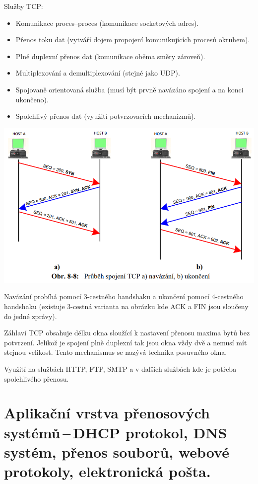 Služby TCP:
\begin{itemize}[noitemsep]
    \item Komunikace proces--proces (komunikace socketových adres).
    \item Přenos toku dat (vytváří dojem propojení komunikujících procesů okruhem).
    \item Plně duplexní přenos dat (komunikace oběma směry zároveň).
    \item Multiplexování a demultiplexování (stejné jako UDP).
    \item Spojovaně orientovaná služba (musí být prvně navázáno spojení a na konci ukončeno).
    \item Spolehlivý přenos dat (využití potvrzovacích mechanizmů).
\end{itemize}

\begin{center}
\includegraphics[scale = 0.5]{images/-052.png}
\end{center}

Navázání probíhá pomocí 3-cestného handshaku a ukončení pomocí 4-cestného handshaku (existuje 3-cestná varianta na obrázku kde ACK a FIN jsou sloučeny do jedné zprávy). 

Záhlaví TCP obsahuje délku okna sloužící k nastavení přenosu maxima bytů bez potvrzení. Jelikož je spojení plně duplexní tak jsou okna vždy dvě a nemusí mít stejnou velikost. Tento mechanismus se nazývá technika posuvného okna. 

Využití na službách HTTP, FTP, SMTP a v dalších službách kde je potřeba spolehlivého přenosu.

\clearpage
\section{Aplikační vrstva přenosových systémů\,--\,DHCP protokol, DNS systém, přenos souborů, webové protokoly, elektronická pošta.}

